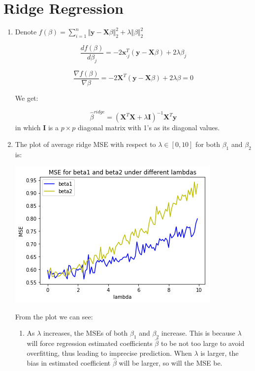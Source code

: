 \documentclass[paper=letter, fontsize=12pt]{article}
\begin{document}
\section{Ridge Regression}

\begin{enumerate}[label=(\alph*)]
	\item Denote $f(\beta) = \sum_{i = 1}^{n} \Vert \boldsymbol{y} - \boldsymbol{X} \beta \Vert_2^2 + \lambda \Vert \beta \Vert_2^2$
	
	$$\frac{d f(\beta)}{d \beta_j} = -2 \boldsymbol{x}_{\cdot j}^T (\boldsymbol{y} - \boldsymbol{X} \beta ) + 2 \lambda \beta_j$$
	
	$$\frac{\nabla f(\beta)}{\nabla \beta} = -2 \boldsymbol{X}^T (\boldsymbol{y} - \boldsymbol{X} \beta) + 2 \lambda \beta = 0$$
	
	We get:
	
	$$\hat{\beta}^{ridge} = (\boldsymbol{X}^T \boldsymbol{X} + \lambda \boldsymbol{I})^{-1} \boldsymbol{X}^T \boldsymbol{y}$$ in which $\boldsymbol{I}$ is a $p \times p$ diagonal matrix with 1's as its diagonal values.
	
	\item The plot of average ridge MSE with respect to $\lambda \in [0, 10]$ for both $\beta_1$ and $\beta_2$ is:
	
	\includegraphics[scale=0.6]{q3b.png}
	
	From the plot we can see:
	
	\begin{enumerate}[label=(\arabic*)]
		\item As $\lambda$ increases, the MSEs of both $\beta_1$ and $\beta_2$ increase. This is because $\lambda$ will force regression estimated coefficients $\hat{\beta}$ to be not too large to avoid overfitting, thus leading to imprecise prediction. When $\lambda$ is larger, the bias in estimated coefficient $\hat{\beta}$ will be larger, so will the MSE be.
		

\end{enumerate}
\end{enumerate}
\end{document}
